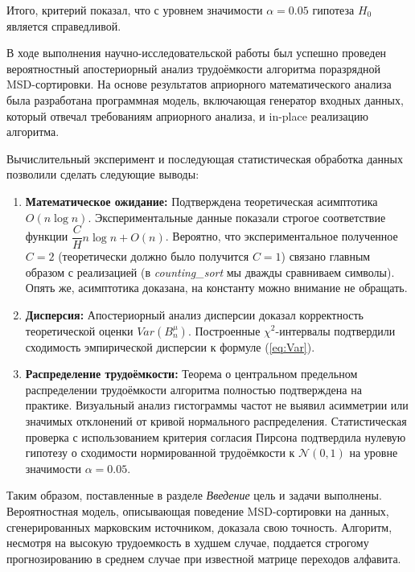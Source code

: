 \documentclass[a4paper, 12pt]{article}
\begin{document}
Итого, критерий показал, что с уровнем значимости $\alpha = 0.05$ гипотеза $H_0$ является справедливой.

 
\newpage
{}
В ходе выполнения научно-исследовательской работы был успешно проведен вероятностный апостериорный анализ трудоёмкости алгоритма поразрядной MSD-сортировки. На основе результатов априорного математического анализа была разработана программная модель, включающая генератор входных данных, который отвечал требованиям априорного анализа, и in-place реализацию алгоритма.

Вычислительный эксперимент и последующая статистическая обработка данных позволили сделать следующие выводы:
\begin{enumerate}
	\item \textbf{Математическое ожидание:} Подтверждена теоретическая асимптотика $O(n\log{n})$. Экспериментальные данные показали строгое соответствие функции $\dfrac{C}{H}n\log{n}+O(n)$. Вероятно, что экспериментальное полученное $C=2$ (теоретически должно было получится  $C=1$) связано главным образом с реализацией (в \textit{counting\_sort} мы дважды сравниваем символы). Опять же, асимптотика доказана, на константу можно внимание не обращать.
	\item \textbf{Дисперсия:} Апостериорный анализ дисперсии доказал корректность теоретической оценки $Var(B_n^\mu)$. Построенные $\chi^2$-интервалы подтвердили сходимость эмпирической дисперсии к формуле (\ref{eq:Var}).
	\item \textbf{Распределение трудоёмкости:} Теорема о центральном предельном распределении трудоёмкости алгоритма полностью подтверждена на практике. Визуальный анализ гистограммы частот не выявил асимметрии или значимых отклонений от кривой нормального распределения. Статистическая проверка с использованием критерия согласия Пирсона подтвердила нулевую гипотезу о сходимости нормированной трудоёмкости к $\mathcal{N}(0,1)$ на уровне значимости $\alpha = 0.05$.
\end{enumerate}

Таким образом, поставленные в разделе \textit{Введение} цель и задачи выполнены. Вероятностная модель, описывающая поведение MSD-сортировки на данных, сгенерированных марковским источником, доказала свою точность. Алгоритм, несмотря на высокую трудоемкость в худшем случае, поддается строгому прогнозированию в среднем случае при известной матрице переходов алфавита.
\end{document}
